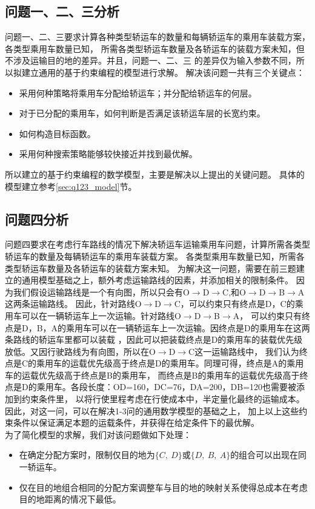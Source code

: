\documentclass[UTF8，12pt]{ctexart}
\begin{document}
\subsection{问题一、二、三分析}
问题一、二、三要求计算各种类型轿运车的数量和每辆轿运车的乘用车装载方案，各类型乘用车数量已知，
所需各类型轿运车数量及各轿运车的装载方案未知，但不涉及运输目的地的差异。并且，问题一、二、三
的差异仅为输入参数不同，所以拟建立通用的基于约束编程的模型进行求解。
解决该问题一共有三个关键点：
\begin{itemize}
	\item 采用何种策略将乘用车分配给轿运车；并分配给轿运车的何层。
	\item 对于已分配的乘用车，如何判断是否满足该轿运车层的长宽约束。
	\item 如何构造目标函数。
	\item 采用何种搜索策略能够较快接近并找到最优解。
\end{itemize}
所以建立的基于约束编程的数学模型，主要是解决以上提出的关键问题。
具体的模型建立参考\ref{sec:q123_model}节。




\subsection{问题四分析}
问题四要求在考虑行车路线的情况下解决轿运车运输乘用车问题，计算所需各类型轿运车的数量及每辆轿运车的乘用车装载方案。
各类型乘用车数量已知，所需各类型轿运车数量及各轿运车的装载方案未知。
为解决这一问题，需要在前三题建立的通用模型基础之上，额外考虑运输路线的因素，并添加相关的限制条件。
因为我们假设运输路线是一个有向图，所以只会有O$\rightarrow$D$\rightarrow$C,和O$\rightarrow$D$\rightarrow$B$\rightarrow$A这两条运输路线。
因此，针对路线O$\rightarrow$D$\rightarrow$C，可以约束只有终点是D，C的乘用车可以在一辆轿运车上一次运输。针对路线O$\rightarrow$D$\rightarrow$B$\rightarrow$A，
可以约束只有终点是D，B，A的乘用车可以在一辆轿运车上一次运输。因终点是D的乘用车在这两条路线的轿运车里都可以装载
，因此可以把装载终点是D的乘用车的装载优先级放低。又因行驶路线为有向图，所以在O$\rightarrow$D$\rightarrow$C这一运输路线中，
我们认为终点是C的乘用车的运载优先级高于终点是D的乘用车。同理可得，终点是A的乘用车的运载优先级高于终点是B的乘用车，
而终点是B的乘用车的运载优先级高于终点是D的乘用车。各段长度：OD=160，DC=76，DA=200，DB=120也需要被添加到约束条件里，
以将行使里程考虑在行使成本中，半定量化最终的运输成本。因此，对这一问，可以在解决1-3问的通用数学模型的基础之上，
加上以上这些约束条件以保证满足本题的运载条件，并获得在给定条件下的最优解。\\
为了简化模型的求解，我们对该问题做如下处理：
\begin{itemize}
	\item 在确定分配方案时，限制仅目的地为$\{C,~D\}$或$\{D,~B,~A\}$的组合可以出现在同一轿运车。
	\item 仅在目的地组合相同的分配方案调整车与目的地的映射关系使得总成本在考虑目的地距离的情况下最低。
\end{itemize}
\end{document}
